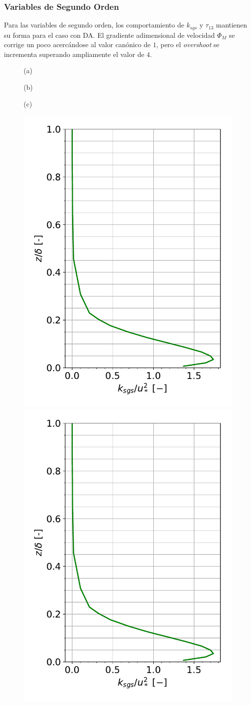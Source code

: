 \subsubsection{Variables de Segundo Orden}
Para las variables de segundo orden, los comportamiento de $k_{sgs}$ y $\tau_{13}$ mantienen su forma para el caso con DA. El gradiente adimensional de velocidad $\Phi_M$ se corrige un poco acercándose al valor canónico de $1$, pero el \emph{overshoot} se incrementa superando ampliamente el valor de $4$.

\begin{figure}[H]
	\begin{minipage}{0.33\linewidth}
		\centering \hspace{1cm}(a)
	\end{minipage}%
	\begin{minipage}{0.33\linewidth}
		\centering \hspace{0.8cm}(b)
	\end{minipage}%
	\begin{minipage}{0.33\linewidth}
		\centering \hspace{0.5cm}(c)
	\end{minipage}%
	\vspace{-4mm}
	\begin{center}
		\includegraphics[height=0.5\linewidth,page=1,trim={6mm 5mm 3mm 0mm},clip]{Imagenes/06/hov_da/mean_data}%
		\includegraphics[height=0.5\linewidth,page=2,trim={12mm 5mm 3mm 0mm},clip]{Imagenes/06/hov_da/mean_data}%

\end{center}
\end{figure}
